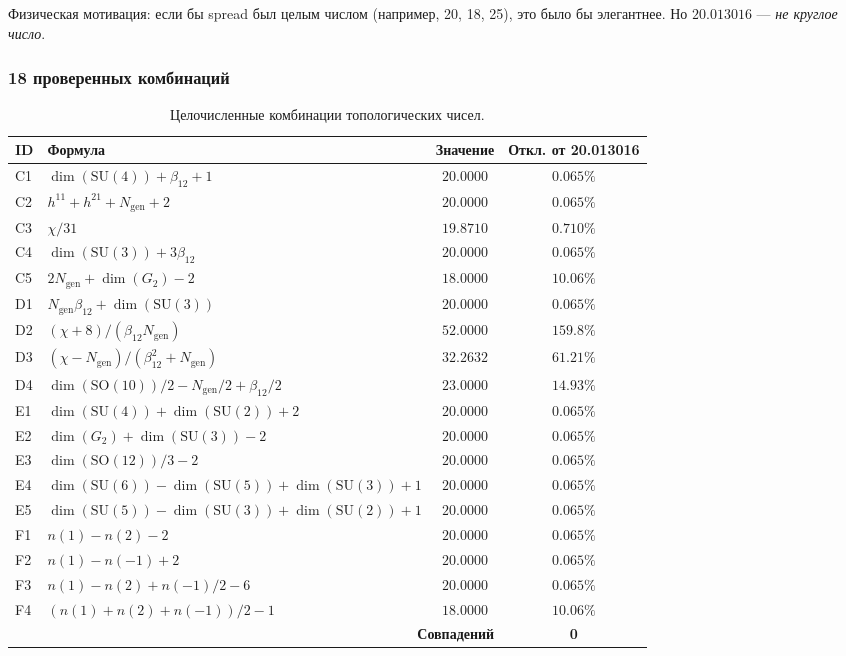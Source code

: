 \documentclass[11pt,a4paper]{article}
\newcommand{\SU}{\ensuremath{\mathrm{SU}}}
\newcommand{\SO}{\ensuremath{\mathrm{SO}}}
\theoremstyle{definition}
\begin{document}
\medskip\noindent
Физическая мотивация: если бы spread был целым числом
(например, 20, 18, 25), это было бы элегантнее. Но
$20.013016$ --- \emph{не круглое число}.

\subsubsection{18 проверенных комбинаций}

\begin{table}[ht]
\centering
\caption{Целочисленные комбинации топологических чисел.}
\label{tab:integer-combinations}
\begin{tabular}{llcc}
\toprule
ID & Формула & Значение & Откл. от 20.013016 \\
\midrule
C1 & $\dim(\SU(4)) + \beta_{12} + 1$ & $20.0000$ & $0.065\%$ \\
C2 & $h^{11} + h^{21} + N_{\text{gen}} + 2$ & $20.0000$ & $0.065\%$ \\
C3 & $\chi/31$ & $19.8710$ & $0.710\%$ \\
C4 & $\dim(\SU(3)) + 3\beta_{12}$ & $20.0000$ & $0.065\%$ \\
C5 & $2 N_{\text{gen}} + \dim(G_2) - 2$ & $18.0000$ & $10.06\%$ \\
D1 & $N_{\text{gen}} \beta_{12} + \dim(\SU(3))$ & $20.0000$ & $0.065\%$ \\
D2 & $(\chi + 8)/(\beta_{12} N_{\text{gen}})$ & $52.0000$ & $159.8\%$ \\
D3 & $(\chi - N_{\text{gen}})/(\beta_{12}^2 + N_{\text{gen}})$ & $32.2632$ & $61.21\%$ \\
D4 & $\dim(\SO(10))/2 - N_{\text{gen}}/2 + \beta_{12}/2$ & $23.0000$ & $14.93\%$ \\
E1 & $\dim(\SU(4)) + \dim(\SU(2)) + 2$ & $20.0000$ & $0.065\%$ \\
E2 & $\dim(G_2) + \dim(\SU(3)) - 2$ & $20.0000$ & $0.065\%$ \\
E3 & $\dim(\SO(12))/3 - 2$ & $20.0000$ & $0.065\%$ \\
E4 & $\dim(\SU(6)) - \dim(\SU(5)) + \dim(\SU(3)) + 1$ & $20.0000$ & $0.065\%$ \\
E5 & $\dim(\SU(5)) - \dim(\SU(3)) + \dim(\SU(2)) + 1$ & $20.0000$ & $0.065\%$ \\
F1 & $n(1) - n(2) - 2$ & $20.0000$ & $0.065\%$ \\
F2 & $n(1) - n(-1) + 2$ & $20.0000$ & $0.065\%$ \\
F3 & $n(1) - n(2) + n(-1)/2 - 6$ & $20.0000$ & $0.065\%$ \\
F4 & $(n(1) + n(2) + n(-1))/2 - 1$ & $18.0000$ & $10.06\%$ \\
\midrule
\multicolumn{3}{r}{\textbf{Совпадений}} & \textbf{0} \\
\bottomrule
\end{tabular}
\end{table}
\end{document}

